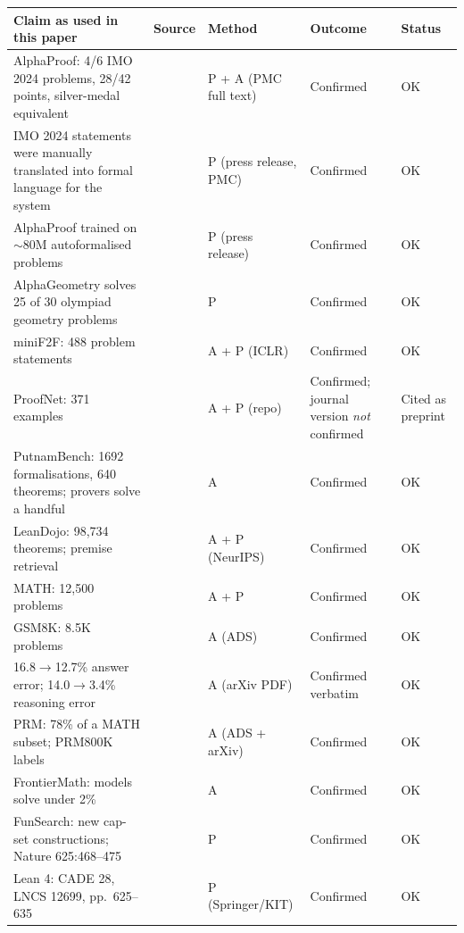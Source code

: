 \documentclass[11pt,a4paper]{article}
\theoremstyle{plain}
\theoremstyle{remark}
\begin{document}
\begin{table}[htbp]
\centering\footnotesize
\begin{tabular}{@{}p{5.2cm}p{1.6cm}p{1.7cm}p{2.4cm}p{1.6cm}@{}}
\toprule
\textbf{Claim as used in this paper} & \textbf{Source} & \textbf{Method} & \textbf{Outcome} & \textbf{Status}\\
\midrule
AlphaProof: 4/6 IMO 2024 problems, 28/42 points, silver-medal equivalent & \cite{hubert2025alphaproof} & P + A (PMC full text) & Confirmed & OK \\
IMO 2024 statements were manually translated into formal language for the system & \cite{hubert2025alphaproof} & P (press release, PMC) & Confirmed & OK \\
AlphaProof trained on $\sim$80M autoformalised problems & \cite{hubert2025alphaproof} & P (press release) & Confirmed & OK \\
AlphaGeometry solves 25 of 30 olympiad geometry problems & \cite{trinh2024alphageometry} & P & Confirmed & OK \\
miniF2F: 488 problem statements & \cite{han2022minif2f} & A + P (ICLR) & Confirmed & OK \\
ProofNet: 371 examples & \cite{azerbayev2023proofnet} & A + P (repo) & Confirmed; journal version \emph{not} confirmed & Cited as preprint \\
PutnamBench: 1692 formalisations, 640 theorems; provers solve a handful & \cite{tsoukalas2024putnambench} & A & Confirmed & OK \\
LeanDojo: 98,734 theorems; premise retrieval & \cite{yang2023leandojo} & A + P (NeurIPS) & Confirmed & OK \\
MATH: 12,500 problems & \cite{hendrycks2021math} & A + P & Confirmed & OK \\
GSM8K: 8.5K problems & \cite{cobbe2021gsm8k} & A (ADS) & Confirmed & OK \\
16.8$\to$12.7\% answer error; 14.0$\to$3.4\% reasoning error & \cite{uesato2022process} & A (arXiv PDF) & Confirmed verbatim & OK \\
PRM: 78\% of a MATH subset; PRM800K labels & \cite{lightman2023letsverify} & A (ADS + arXiv) & Confirmed & OK \\
FrontierMath: models solve under 2\% & \cite{glazer2024frontiermath} & A & Confirmed & OK \\
FunSearch: new cap-set constructions; Nature 625:468--475 & \cite{romera2024funsearch} & P & Confirmed & OK \\
Lean 4: CADE 28, LNCS 12699, pp.\ 625--635 & \cite{moura2021lean4} & P (Springer/KIT) & Confirmed & OK \\

\end{tabular}
\end{table}
\end{document}
